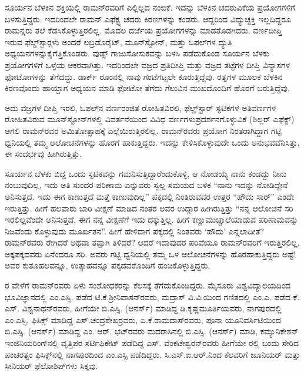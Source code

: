 ಸೂರ್ಯನ ಬೆಳಕಿನ ಶಕ್ತಿಯಲ್ಲಿ ರಾಮನ್‍ರವರಿಗೆ ಎಲ್ಲಿಲ್ಲದ ನಂಬಿಕೆ. ಇದನ್ನು ಬೆಳಕಿನ ಚದರುವಿಕೆಯ ಪ್ರಯೋಗಗಳಿಗೆ ಬಳಸುತ್ತಿದ್ದರು. ಇದರಿಂದಲೇ ರಾಮನ್ ಎಫೆಕ್ಟ್ನ ಚದರು ಕಿರಣಗಳನ್ನು ಕಂಡರು. ಆದ್ದರಿಂದ ವಿದ್ಯುಚ್ಛಕ್ತಿ ಇಲ್ಲದಿದ್ದರೂ ರಾಮನ್ನರು ತಲೆ ಕೆಡಸಿಕೊಳ್ಳುತ್ತಿರಲಿಲ್ಲ. ಮೊದಲ ದರ್ಜೆಯ ಪ್ರಯೋಗಗಳನ್ನು ಮಾಡತೊಡಗಿದರು. ವರ್ಣದೀಪ್ತಿ ಇರುವ ಫೆಲ್ಡ್‌ಸ್ಟಾರ್‍ಗಳು ಅಂದರೆ ಲಬ್ರಡೊರೈಟ್, ಮೂನ್‍ಸ್ಟೋನ್, ಮತ್ತು ಓಪಲ್‍ಗಳ ದ್ಯುತಿ ಅಧ್ಯಯನಗಳನ್ನು\break ಕೈಗೆತ್ತಿಕೊಂಡರು. ವುಡ್ಸ್ ಗಾಜುಸೋಸುಕವನ್ನು ಬಳಸಿ ಪಡೆದುಕೊಂಡ ಸೂರ್ಯನ ಬೆಳಕು ಪ್ರಯೋಗಗಳಿಗೆ ಒಳ್ಳೆಯ ಆಕರವಾಗಿತ್ತು. ಇದರಿಂದಲೇ ವಜ್ರದ ಪ್ರತಿದೀಪ್ತಿ ಮತ್ತು ವಜ್ರದ ತಟ್ಟೆಗಳ ದೀಪ್ತಿ ವಿನ್ಯಾಸಗಳ ಫೋಟೋಗಳನ್ನು ತೆಗೆದದ್ದು. ಡಾರ್ಕ್ ರೂಂನಲ್ಲಿ ನಾವು ಗಂಟೆಗಟ್ಟಲೇ ಕೂರುತ್ತಿದ್ದೆವು. ರತ್ನಗಳ ಮೂಲಕ ಬೆಳಕಿನ ಕಿರಣವೊಂದು ಹಾಯ್ದಾಗ ಅಧ್ಯಯನ ಮಾಡಿ ಫೋಟೋ ತೆಗೆದು ಗೆಲುವಿನ ಮುಖದೊಂದಿಗೆ ಹೊರಗೆ ಬರುತ್ತಿದ್ದೆವು.

ಅದು ವಜ್ರಗಳ ದೀಪ್ತಿ ಇರಲಿ, ಓಪಲ್‍ನ ವರ್ಣರಂಜಿತ ರೋಹಿತವಿರಲಿ, ಫೆಲ್ಡ್‌ಸ್ಟಾರ್ ಸ್ಫಟಿಕಗಳ ಅತಿವರ್ಣಗಳ ರೋಹಿತವಿರುವ ಮೂನ್‍ಸ್ಟೋನ್‍ಗಳಲ್ಲಿ ವಿವರ್ತನೆಯಿಂದ ವಿವಿಧ ವರ್ಣಗಳು\break ಪ್ರದರ್ಶನಗೊಳ್ಳುವಿಕೆ (ಶಿಲ್ಲರ್ ಎಫೆಕ್ಟ್) ಆಗಲಿ ರಾಮನ್‍ರವರ ಅಮಿತೋತ್ಸಾಹಕ್ಕೆ ಎಲ್ಲೆಯಿರು\-ತ್ತಿರಲಿಲ್ಲ. ರಾಮನ್‍ರವರು ಪ್ರಯೋಗ ನಿರತರಾಗಿದ್ದಾಗ ಗಟ್ಟಿ ಧ್ವನಿಯಲ್ಲಿ ತಮ್ಮ ಆಲೋಚನೆಗಳನ್ನು ಹೊರಗೆ ಹಾಕುತ್ತಿದ್ದರು. ಇದನ್ನು ಕೇಳಿಸಿಕೊಳ್ಳುವುದೇ ಒಂದು ಅನುಭವವೆನಿಸಿತ್ತು, ಈ ಸಂದರ್ಭವು ಹೀಗಿರುತ್ತಿತ್ತು.

ಸೂರ್ಯನ ಬೆಳಕು ಬಿದ್ದ ಒಂದು ಸ್ಫಟಿಕವನ್ನು ಗಮನಿಸುತ್ತಿದ್ದಾರೆಂದುಕೊಳ್ಳಿ, ಆ ನೋಡಯ್ಯ ನಾನು ಕಂಡದ್ದು ನೀನು ನಂಬುವುದಿಲ್ಲ, ಇದು ಅತಿ ಸುಂದರ ಪರಿಣಾಮ ಎನ್ನುವರು ಸ್ವಲ್ಪ ಸಮಯದ ಬಳಿಕ “ನಾನು ಇದನ್ನು ನೋಡಿದ್ದೇನೆ ಅನಿಸುತ್ತದೆ. ಇದು ಈಗ ಕಾಣುತ್ತದೆ ಮತ್ತೆ ಕಾಣುವುದಿಲ್ಲ” ಪಕ್ಕದಲ್ಲಿ ನಿಂತಿರುವವರ ಉತ್ತರ “ಹೌದು ಸಾರ್” ಎಂದೇ ಇರುತ್ತಿತ್ತು. ಹೀಗೆ ಹಲವಾರು ಬಾರಿ ವೀಕ್ಷಣೆ ಮಾಡಿದ ನಂತರ ಅವರ ಉದ್ಗಾರ ಹೀಗಿರುತ್ತಿತ್ತು  “ನನ್ನ ಆಲೋಚನೆ ಸರಿ ಇರಲಿಲ್ಲವೆಂದೇ ಅನಿಸುತ್ತದೆ, ಈಗ ನನ್ನ ವೀಕ್ಷಣೆಗೆ ಇದು ದಕ್ಕುತ್ತಿಲ್ಲ. ಹೀಗೆ ಕಣ್ಣುಮುಚ್ಚಾಲೆಯಾಡುವ ಪರಿಣಾಮವನ್ನು ನಿಜವೆಂದು ಕೊಳ್ಳುವುದು ಮೂರ್ಖತನ”. ಹೀಗೆ ಹೇಳಿದಾಗ ಪಕ್ಕದಲ್ಲಿ ನಿಂತವರು ‘ಹೌದು’ ಎನ್ನಲಾದೀತೆ? ರಾಮನ್‍ರವರು ರೇಗಿದರೆ ಅಥವಾ ತಪ್ಪಾಗಿ ತಿಳಿದರೆ? ಆದರೆ ಇದಾವುದರ ಪರಿವೆಯೂ ರಾಮನ್‍ರವರಿಗೆ ಇರುತ್ತಿರಲಿಲ್ಲ. ಅಕ್ಕಪಕ್ಕದವರು ಏನೆಂದರೂ ಸರಿ. ಅವರು ಗಟ್ಟಿ ಧ್ವನಿಯಲ್ಲಿ ತಮ್ಮ ಒಳ ಆಲೋಚನೆಗಳನ್ನು ಹೊರಹಾಕುತ್ತಿದ್ದರು ಅಷ್ಟೆ! ಅವರ ಕುತೂಹಲವನ್ನೂ, ಉತ್ಸಾಹವನ್ನೂ ಪಕ್ಕದವರೊಂದಿಗೆ ಹಂಚಿಕೊಳ್ಳುತ್ತಿದ್ದರು.

ರ ವೇಳೆಗೆ ರಾಮನ್‍ರವರು ಏಳು ಸಂಶೋಧಕರನ್ನು ಕೆಲಸಕ್ಕೆ ತೆಗೆದುಕೊಂಡಿದ್ದರು. ಮೈಸೂರು ವಿಶ್ವವಿದ್ಯಾಲಯದಿಂದ ಭೂವಿಜ್ಞಾನದಲ್ಲಿ ಎಂ.ಎಸ್ಸಿ. ಪಡೆದ ಟಿ.ಕೆ.ಶ‍್ರೀನಿವಾಸನ್‍ರವರು, ಮದ್ರಾಸ್ ವಿ.ವಿ.ಯಿಂದ ಗಣಿತದಲ್ಲಿ ಎಂ.ಎ. ಪಡೆದ ಕೆ. ಎಸ್. ವಿಶ್ವನಾಥನ್‍ರವರು, ಹೀಗೆಯೇ ಬಿ.ಎಸ್ಸಿ. (ಆನರ್ಸ್) ಮಾಡಿದ್ದ ಡಿ.ಕೃಷ್ಣಮೂರ್ತಿಯವರು, ನಾಗಪುರದಲ್ಲಿ ಎಂ.ಎಸ್ಸಿ. ಫಿಸಿಕ್ಸ್ ಮಾಡಿದ್ದ ಎಸ್.ಚಂದ್ರಶೇಖರ್‍ರವರು, ಏ.ಕೆ.ರಾಮದಾಸ್‍ರವರು, ಪೂನಾ ಯೂನಿವರ್ಸಿಟಿಯಿಂದ ಬಿ.ಎಸ್ಸಿ. (ಆನರ್ಸ್) ಮಾಡಿದ್ದ ಎಂ. ಆರ್. ಭಟ್‍ರವರು ಮದರಾಸಿನಲ್ಲಿ ಬಿ.ಎಸ್ಸಿ. (ಆನರ್ಸ್) ಮಾಡಿ, ಕಮ್ಯುನಿಕೇಶನ್ ಇಂಜಿನಿಯರಿಂಗ್‍ನಲ್ಲಿ ವೃತ್ತಿಪರ ಸರ್ಟಿಫಿಕೇಟ್ ಪಡೆದಿದ್ದ ಎಸ್. ವೆಂಕಟೇಶ್ವರನ್‍ರವರು ಹೀಗೆಯೇ ರಲ್ಲಿ ಬಂದು ಸೇರಿದ ಪಂಚರತ್ನಂ ಫಿಸಿಕ್ಸ್‌ನಲ್ಲಿ ನಾಗಪುರದಿಂದ ಎಂ.ಎಸ್ಸಿ ಪಡೆದಿದ್ದರು. ಸಿ.ಎಸ್.ಐ.ಆರ್.ನಿಂದ ಕೆಲವರಿಗೆ ಜೂನಿಯರ್ ಮತ್ತು ಸೀನಿಯರ್ ಫೆಲೋ\-ಶಿಪ್‍ಗಳು ಸಿಕ್ಕವು.

